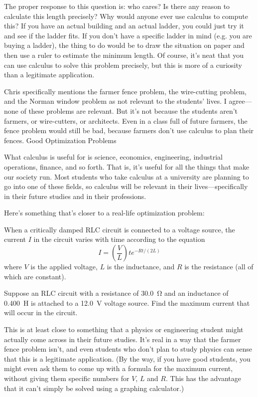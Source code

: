 The proper response to this question is: who cares? Is there any reason to calculate this length precisely? Why would anyone ever use calculus to compute this? If you have an actual building and an actual ladder, you could just try it and see if the ladder fits. If you don't have a specific ladder in mind (e.g. you are buying a ladder), the thing to do would be to draw the situation on paper and then use a ruler to estimate the minimum length. Of course, it's neat that you can use calculus to solve this problem precisely, but this is more of a curiosity than a legitimate application.

Chris specifically mentions the farmer fence problem, the wire-cutting problem, and the Norman window problem as not relevant to the students' lives. I agree—none of these problems are relevant. But it's not because the students aren't farmers, or wire-cutters, or architects. Even in a class full of future farmers, the fence problem would still be bad, because farmers don't use calculus to plan their fences.
Good Optimization Problems

What calculus is useful for is science, economics, engineering, industrial operations, finance, and so forth. That is, it's useful for all the things that make our society run. Most students who take calculus at a university are planning to go into one of these fields, so calculus will be relevant in their lives—specifically in their future studies and in their professions.

Here's something that's closer to a real-life optimization problem:

\begin{adjustwidth}{1cm}{}
  When a critically damped RLC circuit is connected to a voltage source, the current $ I $ in the circuit varies with time according to the equation
  \begin{displaymath}
    I = \left(\frac{V}{L}\right)te^{-Rt/(2L)}
  \end{displaymath}
  where $V$ is the applied voltage, $L$ is the inductance, and $R$ is the resistance (all of which are constant).

  Suppose an RLC circuit with a resistance of \SI{30.0}{\ohm} and an inductance of \SI{0.400}{\henry} is attached to a \SI{12.0}{\volt} voltage source. Find the maximum current that will occur in the circuit.
\end{adjustwidth}

This is at least close to something that a physics or engineering student might actually come across in their future studies. It's real in a way that the farmer fence problem isn't, and even students who don't plan to study physics can sense that this is a legitimate application. (By the way, if you have good students, you might even ask them to come up with a formula for the maximum current, without giving them specific numbers for $ V $, $ L $ and $ R $. This has the advantage that it can't simply be solved using a graphing calculator.)

